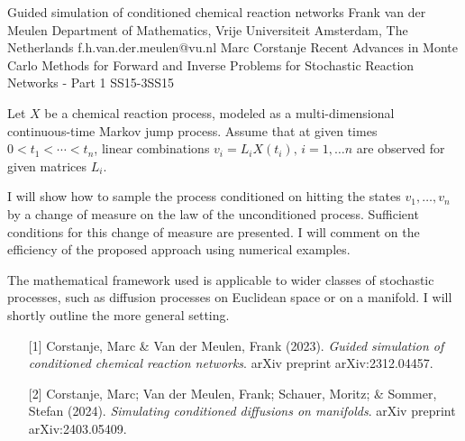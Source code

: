 \begin{talk}
  {Guided simulation of conditioned chemical reaction networks}%
  {Frank van der Meulen}%
  {Department of Mathematics, Vrije Universiteit Amsterdam, The Netherlands}%
  {f.h.van.der.meulen@vu.nl}%
  {Marc Corstanje}%
{Recent Advances in Monte Carlo Methods for Forward and Inverse Problems for Stochastic Reaction Networks - Part 1}
{}{SS15-3}{SS15}

		
			

		Let $X$ be a chemical reaction process, modeled as a multi-dimensional continuous-time Markov jump process.  Assume that at given times $0< t_1 < \cdots <t_n$, linear combinations $v_i = L_i X(t_i),\, i=1,\dots n$ are observed for given matrices $L_i$. 
		
I will show how to sample the process conditioned on hitting the states $v_1,\dots, v_n$ by  a change of measure on the law of the unconditioned process. Sufficient conditions for this change of measure are presented. I will comment on the efficiency of the proposed approach using numerical examples.

The mathematical framework used is applicable to wider classes of stochastic processes, such as diffusion processes on Euclidean space or on a manifold. I will shortly outline the more general setting. 

\medskip

\begin{enumerate}
	\item[{[1]}] Corstanje, Marc \& Van der Meulen, Frank (2023). {\it Guided simulation of conditioned chemical reaction networks}. arXiv preprint arXiv:2312.04457.

\item[{[2]}] Corstanje, Marc; Van der Meulen, Frank; Schauer, Moritz; \& Sommer, Stefan (2024). {\it Simulating conditioned diffusions on manifolds}. arXiv preprint arXiv:2403.05409.
\end{enumerate}

\end{talk}

